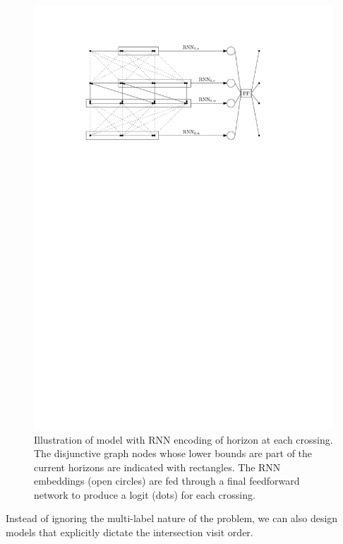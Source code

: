 \documentclass[a4paper]{article}
\theoremstyle{definition}
\theoremstyle{plain}
\begin{document}
\begin{figure}
  \centering
  \includegraphics[scale=1]{figures/network/rnn_model}
  \caption{Illustration of model with RNN encoding of horizon at each crossing.
    The disjunctive graph nodes whose lower bounds are part of the current
    horizons are indicated with rectangles. The RNN embeddings (open circles)
    are fed through a final feedforward network to produce a logit (dots) for
    each crossing.}
  \label{fig:rnn_model}
\end{figure}

Instead of ignoring the multi-label nature of the problem, we can also design
models that explicitly dictate the intersection visit order.
\end{document}
